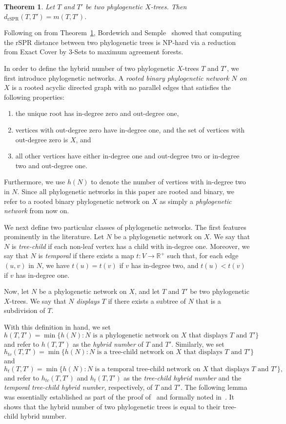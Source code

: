 \documentclass{article}
\newtheorem{theorem}{Theorem}
\newcommand{\rSPR}{\mathrm{rSPR}}
\begin{document}
\begin{theorem}\label{t:spr}
Let $T$ and $T'$ be two phylogenetic $X$-trees. Then $d_\rSPR(T,T')=m(T,T')$.
\end{theorem}

\noindent Following on from Theorem~\ref{t:spr}, Bordewich and Semple~\cite{bordewichSemple2005} showed that computing the rSPR distance between two phylogenetic trees is NP-hard via a reduction from Exact Cover by $3$-Sets to maximum agreement forests.  \medskip

In order to define the hybrid number of two phylogenetic $X$-trees $T$ and $T'$, we first introduce phylogenetic networks. A {\em rooted binary phylogenetic network $N$ on $X$} is a rooted acyclic directed graph with no parallel edges that satisfies the following properties:
\begin{enumerate}
    \itemsep 0pt
    \item the unique root has in-degree zero and  out-degree one,
    \item vertices with out-degree zero have in-degree one, and the set of vertices with out-degree zero is $X$, and
    \item all other vertices have either in-degree one and out-degree two or in-degree two and out-degree one.
\end{enumerate}
Furthermore, we use $h(N)$ to denote the number of vertices with in-degree two in $N$. Since all phylogenetic networks in this paper are rooted and binary, we refer to a rooted binary phylogenetic network on $X$ as simply a {\em phylogenetic network} from now on.

We next define two particular classes of phylogenetic networks. The first features prominently in the literature. Let $N$ be a phylogenetic network on $X$. We say that $N$ is {\em tree-child} if each non-leaf vertex has a child with in-degree one. Moreover, we say that $N$ is {\em temporal} if there exists a map $t: V\rightarrow {\mathbb R}^+$ such that, for each edge $(u,v)$ in $N$, we have $t(u)=t(v)$ if $v$ has in-degree two, and $t(u) < t(v)$ if $v$ has in-degree one. 

Now, let $N$ be a phylogenetic network on $X$, and let $T$ and $T'$ be two phylogenetic $X$-trees. We say that $N$ {\em displays} $T$ if there exists a subtree of $N$ that is a subdivision of $T$. 

With this definition in hand, we set
$$h(T,T')=\min\{h(N): N \text{ is a phylogenetic network on } X \text{ that displays }T \text{ and }T'\}$$
and refer to $h(T,T')$ as the {\em hybrid number} of $T$ and $T'$. Similarly, we set 
$$h_{tc}(T,T')=\min\{h(N): N \text{ is a tree-child network on } X \text{ that displays }T \text{ and }T'\}$$
and
$$h_t(T,T')=\min\{h(N): N \text{ is a temporal tree-child network on } X \text{ that displays }T \text{ and }T'\},$$
and refer to $h_{tc}(T,T')$ and $h_t(T,T')$ as the {\em tree-child hybrid number} and the {\em temporal tree-child hybrid number}, respectively, of $T$ and $T'$. The following lemma was essentially established as part of the proof of~\cite[Theorem 2]{baroni2005bounding} and formally noted  in~\cite{humphries2013cherry}. It shows that the hybrid number of two phylogenetic trees is equal to their tree-child hybrid number.
\end{document}
